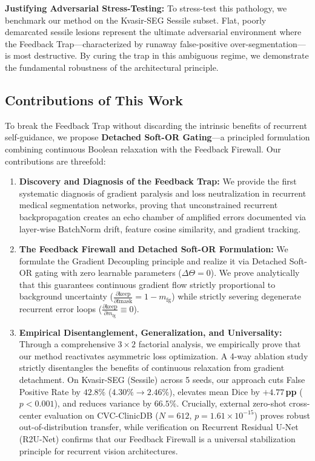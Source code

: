 \textbf{Justifying Adversarial Stress-Testing:}
To stress-test this pathology, we benchmark our method on the Kvasir-SEG
Sessile subset. Flat, poorly demarcated sessile lesions represent the ultimate
adversarial environment where the Feedback Trap---characterized by runaway
false-positive over-segmentation---is most destructive. By curing the trap in
this ambiguous regime, we demonstrate the fundamental robustness of the
architectural principle.

\subsection{Contributions of This Work}
To break the Feedback Trap without discarding the intrinsic benefits of
recurrent self-guidance, we propose \textbf{Detached Soft-OR Gating}---a
principled formulation combining continuous Boolean relaxation with the
Feedback Firewall. Our contributions are threefold:
\begin{enumerate}
  \item \textbf{Discovery and Diagnosis of the Feedback Trap:}
        We provide the first systematic diagnosis of gradient paralysis and
        loss neutralization in recurrent medical segmentation networks, proving
        that unconstrained recurrent backpropagation creates an echo chamber
        of amplified errors documented via layer-wise BatchNorm drift,
        feature cosine similarity, and gradient tracking.
  \item \textbf{The Feedback Firewall and Detached Soft-OR Formulation:}
        We formulate the Gradient Decoupling principle and realize it via
        Detached Soft-OR gating with zero learnable parameters ($\Delta \Theta = 0$).
        We prove analytically that this guarantees continuous gradient flow
        strictly proportional to background uncertainty
        ($\frac{\partial \text{keep}}{\partial \text{fmask}} = 1 - m_{\text{fg}}$)
        while strictly severing degenerate recurrent error loops
        ($\frac{\partial \text{keep}}{\partial m_{\text{fg}}} \equiv 0$).
  \item \textbf{Empirical Disentanglement, Generalization, and Universality:}
        Through a comprehensive $3 \times 2$ factorial analysis, we empirically
        prove that our method reactivates asymmetric loss optimization. A 4-way
        ablation study strictly disentangles the benefits of continuous
        relaxation from gradient detachment. On Kvasir-SEG (Sessile) across 5
        seeds, our approach cuts False Positive Rate by \textbf{$42.8\%$}
        ($4.30\% \to 2.46\%$), elevates mean Dice by \textbf{$+4.77$\,pp}
        ($p < 0.001$), and reduces variance by $66.5\%$. Crucially, external
        zero-shot cross-center evaluation on CVC-ClinicDB ($N = 612$,
        $p = 1.61 \times 10^{-15}$) proves robust out-of-distribution transfer,
        while verification on Recurrent Residual U-Net (R2U-Net) confirms
        that our Feedback Firewall is a universal stabilization principle for
        recurrent vision architectures.
\end{enumerate}
